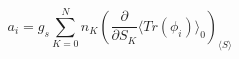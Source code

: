 \begin{equation}
a_{i}=g_{s}\sum_{K=0}^{N}n_{K}\left( \frac{\partial }{\partial S_{K}}\langle
Tr(\phi _{i})\rangle _{0}\right) _{\langle S\rangle }
\end{equation}


